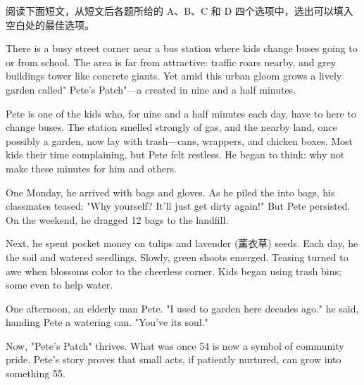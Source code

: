 \documentclass{英语试卷}
\begin{document}
\par 阅读下面短文，从短文后各题所给的 A、B、C 和 D 四个选项中，选出可以填入空白处的最佳选项。\par
\par There is a busy street corner near a bus station where kids change buses going to or from school. The area is far from attractive:  traffic roars nearby, and grey buildings tower like concrete giants. Yet amid this urban gloom grows a lively garden called" Pete's Patch"—a  created in nine and a half minutes.\par
\par Pete is one of the kids who, for nine and a half minutes each day, have to  here to change buses. The station smelled strongly of gas, and the nearby land, once possibly a garden, now lay  with trash—cans, wrappers, and chicken boxes. Most kids  their time complaining, but Pete felt restless. He began to think: why not make these minutes  for him and others.\par
\par One Monday, he arrived with bags and gloves. As he piled the  into bags, his classmates teased: "Why  yourself? It'll just get dirty again!" But Pete persisted. On the weekend, he dragged 12 bags to the landfill.\par
\par Next, he spent pocket money on tulips and lavender (薰衣草) seeds. Each day, he  the soil and watered seedlings. Slowly, green shoots emerged. Teasing turned to awe when blossoms  color to the cheerless corner. Kids began using trash bins; some even  to help water.\par
\par One afternoon, an elderly man  Pete. "I used to garden here decades ago." he said, handing Pete a watering can. "You've  its soul."\par
\par Now, "Pete's Patch" thrives. What was once \blanknum{} 54\blanknum{} is now a symbol of community pride. Pete's story proves that small acts, if patiently nurtured, can grow into something \blanknum{} 55\blanknum{}.\par
{}
\end{document}
